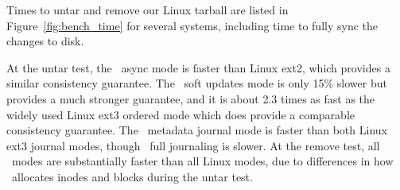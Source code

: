 Times to untar and remove our Linux tarball are listed in
Figure~\ref{fig:bench_time} for several systems, including time to fully sync
the changes to disk.

\begin{figure*}[t]
\caption{\label{fig:bench_time} Untar, delete, PostMark, and Andrew
  benchmark times (seconds). System CPU times are in square brackets.\newline
Kudos times are for FUA, except for ``NOFUA.''
Linux times are for a WB drive cache, except for ``WT.''}
\end{figure*}

At the untar test, the \Kudos\ async mode is faster than Linux ext2, which
provides a similar consistency guarantee. The \Kudos\ soft updates mode is
only 15\% slower but provides a much stronger guarantee, and it is about 2.3
times as fast as the widely used Linux ext3 ordered mode which does provide a
comparable consistency guarantee. The \Kudos\ metadata journal mode is faster
than both Linux ext3 journal modes, though \Kudos\ full journaling is slower.
At the remove test, all \Kudos\ modes are substantially faster than all Linux
modes, due to differences in how \Kudos\ allocates inodes and blocks during
the untar test.

